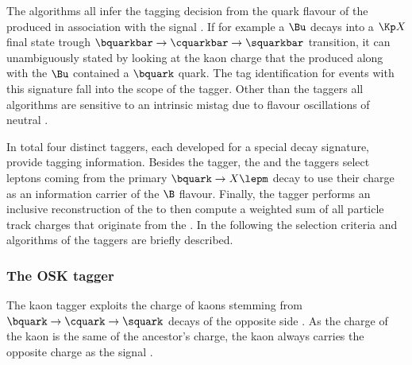 The \OS algorithms all infer the tagging decision from the quark flavour of the
\bhadron produced in association with the signal \Bmeson. If for example a $\Bu$
decays into a $\Kp X$ final state trough $\bquarkbar \to \cquarkbar \to
\squarkbar$ transition, it can unambiguously stated by looking at the kaon
charge that the \bhadron produced along with the $\Bu$ contained a $\bquark$
quark. The tag identification for events with this signature fall into the scope
of the \OSK tagger. Other than the \SS taggers all \OS algorithms are sensitive
to an intrinsic mistag due to flavour oscillations of neutral \Bmesons.

In total four distinct \OS taggers, each developed for a special \OS decay
signature, provide tagging information. Besides the \OSK tagger, the \OSe and
the \OSm taggers select leptons coming from the primary $\bquark \to X \lepm$
decay to use their charge as an information carrier of the $\B$ flavour.
Finally, the \OSvtx tagger performs an inclusive reconstruction of the \OS \SV
to then compute a weighted sum of all particle track charges that originate from
the \SV. In the following the selection criteria and algorithms of the \OS
taggers are briefly described.
 
\subsubsection{The \acl{OSK} tagger}
\label{sec:flavour_tagging:os:kaon}

The kaon tagger exploits the charge of kaons stemming from $\bquark \to
\cquark \to \squark$ decays of the opposite side \bhadron. As the charge of the
kaon is the same of the ancestor's charge, the kaon always carries the opposite
charge as the signal \Bmeson.

